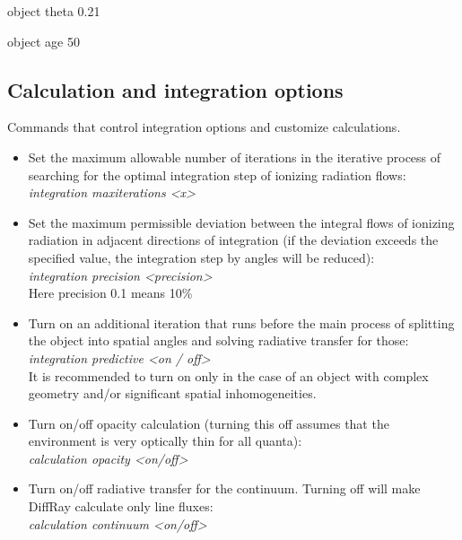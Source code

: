 \documentclass[a4paper]{article}
\begin{document}
\hspace*{0.25cm} object theta 0.21
\vspace{0.1cm}

\hspace*{0.25cm} object age 50\\

\subsection{Calculation and integration options}
Commands that control integration options and customize calculations.
\begin{itemize}
    \item Set the maximum allowable number of iterations in the iterative process of searching for the optimal integration step of ionizing radiation flows: \\
    \hspace*{0.25cm} {\it integration maxiterations <x>}
    \item Set the maximum permissible deviation between the integral flows of ionizing radiation in adjacent directions of integration (if the deviation exceeds the specified value, the integration step by angles will be reduced): \\
    \hspace*{0.25cm} {\it integration precision <precision>} \\
    Here precision 0.1 means 10\%
    \item Turn on an additional iteration that runs before the main process of splitting the object into spatial angles and solving
    radiative transfer for those: \\
    \hspace*{0.25cm} {\it integration predictive <on / off>} \\
    It is recommended to turn on only in the case of an object with complex geometry and/or
    significant spatial inhomogeneities.
    \item Turn on/off opacity calculation (turning this off assumes that the environment is very optically thin for all
    quanta): \\
    \hspace*{0.25cm} {\it calculation opacity <on/off>}
    \item Turn on/off radiative transfer for the continuum. Turning off will make DiffRay calculate only line fluxes: \\
    \hspace*{0.25cm} {\it calculation continuum <on/off>}

\end{itemize}
\end{document}
